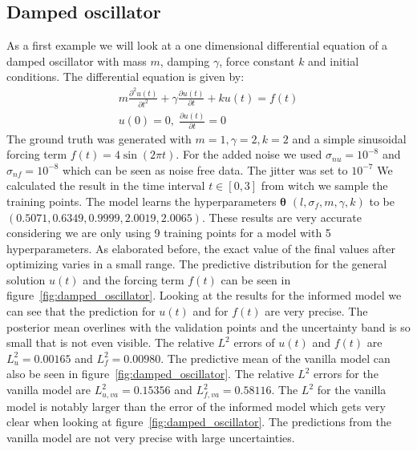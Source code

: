 \documentclass{article}
\begin{document}
\subsection{Damped oscillator}
As a first example we will look at a one dimensional differential equation of a
damped oscillator with mass $m$, damping $\gamma$, force constant $k$ and initial conditions. The
differential equation is given by:
\begin{equation}
    \begin{aligned}
        m\frac{\partial^2 u(t)}{\partial t^2} + \gamma \frac{\partial u(t)}{\partial t} + k u(t) = f(t) \\ u(0) = 0, \; \frac{\partial u(t)}{\partial t} = 0
    \end{aligned}
\end{equation}
The ground truth was generated with $m = 1, \gamma = 2, k = 2$ and a simple sinusoidal forcing term $f(t) = 4 \sin(2\pi t)$. For the added noise we used $\sigma_{nu} = 10^{-8}$ and $\sigma_{nf} = 10^{-8}$ which can be seen as noise free data. The jitter was set to $10^{-7}$ We calculated the result in the time interval $t \in [0,3]$ from witch we sample the training points. The model learns the hyperparameters $\bm{\theta}$ $(l,\sigma_f,m,\gamma,k)$ to be $(0.5071, 0.6349, 0.9999, 2.0019, 2.0065)$. These results are very accurate considering we are only using 9 training points for a model with 5 hyperparameters. As elaborated before, the exact value of the final values after optimizing varies in a small range. The predictive distribution for the general solution $u(t)$ and the forcing term $f(t)$ can be seen in figure~\ref{fig:damped_oscillator}. Looking at the results for the informed model we can see that the prediction for $u(t)$ and for $f(t)$ are very precise. The posterior mean overlines with the validation points and the uncertainty band is so small that is not even visible. The relative $L^2$ errors of $u(t)$ and $f(t)$ are $L^2_u = 0.00165$ and $L^2_f = 0.00980$. The predictive mean of the vanilla model can also be seen in figure~\ref{fig:damped_oscillator}. The relative $L^2$ errors for the vanilla model are $L^2_{u,va} = 0.15356$ and $L^2_{f,va} = 0.58116$. The $L^2$ for the vanilla model is notably larger than the error of the informed model which gets very clear when looking at figure~\ref{fig:damped_oscillator}. The predictions from the vanilla model are not very precise with large uncertainties. %
\end{document}
